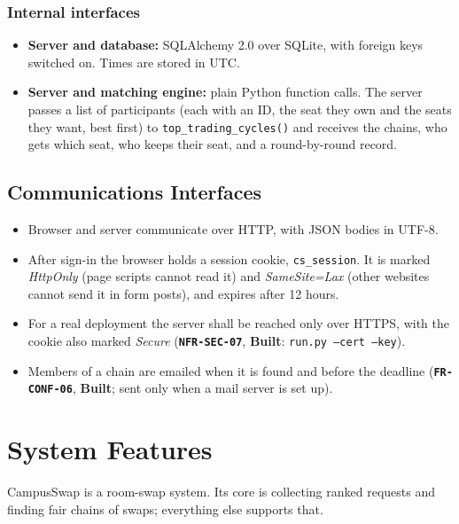 \documentclass[11pt,a4paper,parskip=half,toc=listof]{scrreprt}
\newcommand{\Built}{\textcolor{builtgreen}{\textbf{Built}}}
\newcommand{\Req}[1]{\textbf{\texttt{#1}}}
\begin{document}
\subsection{Internal interfaces}

\begin{itemize}
  \item \textbf{Server and database:} SQLAlchemy 2.0 over SQLite, with
    foreign keys switched on. Times are stored in UTC.
  \item \textbf{Server and matching engine:} plain Python function calls.
    The server passes a list of participants (each with an ID, the seat
    they own and the seats they want, best first) to
    \texttt{top\_trading\_cycles()} and receives the chains, who gets which
    seat, who keeps their seat, and a round-by-round record.
\end{itemize}

\section{Communications Interfaces}

\begin{itemize}
  \item Browser and server communicate over HTTP, with JSON bodies in
    UTF-8.
  \item After sign-in the browser holds a session cookie,
    \texttt{cs\_session}. It is marked \emph{HttpOnly} (page scripts cannot
    read it) and \emph{SameSite=Lax} (other websites cannot send it in
    form posts), and expires after 12 hours.
  \item For a real deployment the server shall be reached only over HTTPS,
    with the cookie also marked \emph{Secure} (\Req{NFR-SEC-07},
    \Built: \texttt{run.py --cert --key}).
  \item Members of a chain are emailed when it is found and before the
    deadline (\Req{FR-CONF-06}, \Built; sent only when a mail server is set up).
\end{itemize}

\chapter{System Features}\label{ch:features}

CampusSwap is a room-swap system. Its core is collecting ranked requests
and finding fair chains of swaps; everything else supports that.
\end{document}
